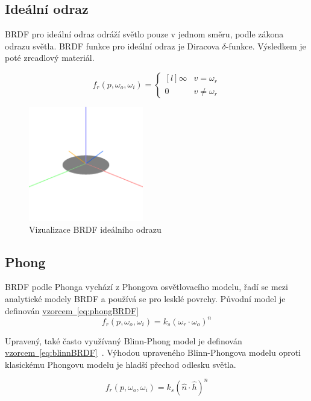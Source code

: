 \documentclass[czech,master]{diploma}
\newcommand{\uvec}[1]{\hat{#1}}
\newcommand{\point}{p}
\newcommand{\brdf}{f_r\left(\point,\omega_{o},\omega_{i}\right)}
\newcommand{\normVec}{\uvec{n}}
\newcommand{\outVec}{\omega_{o}}
\newcommand{\refl}{\omega_{r}}
\newcommand{\halfVec}{\uvec{h}}
\begin{document}
\subsection{Ideální odraz} \label{sec:idealReflection}
BRDF pro ideální odraz odráží světlo pouze v jednom směru, podle zákona odrazu světla. BRDF funkce pro ideální odraz je Diracova \(\delta\)-funkce. Výsledkem je poté zrcadlový materiál.


\begin{equation} \label{eq:idealReflectionBRDF}
  \brdf  =  \left\{\begin{matrix*}[l] \infty & v = \refl \\ 0 & v \neq \refl \end{matrix*}\right.
\end{equation}


\begin{figure}[ht]%
  \centering
  \includegraphics[width=5cm]{Figures/visualizations/brdfMirror.png}
  \caption{Vizualizace BRDF ideálního odrazu}%
  \label{fig:idealReflectionBRDFViz}%
\end{figure}


\subsection{Phong} \label{sec:Phong}
BRDF podle Phonga vychází z Phongova osvětlovacího modelu, řadí se mezi analytické modely BRDF a používá se pro lesklé povrchy. Původní model je definován \hyperref[eq:phongBRDF]{vzorcem~\ref{eq:phongBRDF}}~\cite{Phong1975}
\begin{equation} \label{eq:phongBRDF}
  \brdf = k_s{(\refl\cdot\outVec)}^{n}
\end{equation}

Upravený, také často využívaný Blinn-Phong model je definován \hyperref[eq:blinnBRDF]{vzorcem~\ref{eq:blinnBRDF}}~\cite{BlinnPhong1977}. Výhodou upraveného Blinn-Phongova modelu oproti klasickému Phongovu modelu je hladší přechod odlesku světla.

\begin{equation} \label{eq:blinnBRDF}
  \brdf = k_s{(\normVec\cdot\halfVec)}^{n}
\end{equation}
\end{document}
